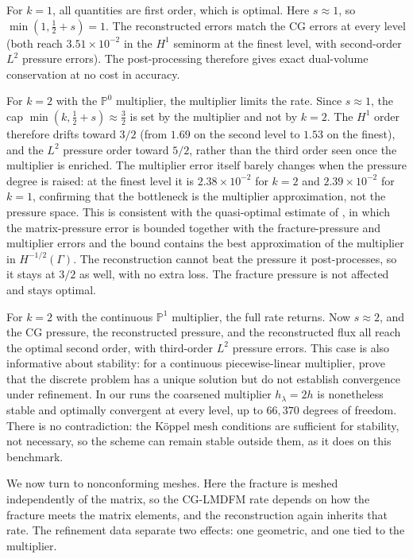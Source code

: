 \documentclass[a4paper,fleqn]{cas-sc}
\begin{document}
For \(k=1\), all quantities are first order, which is optimal. Here \(s\approx1\),
so \(\min(1,\tfrac12+s)=1\). The reconstructed errors match the CG errors at every
level (both reach \(3.51\times10^{-2}\) in the \(H^1\) seminorm at the finest
level, with second-order \(L^2\) pressure errors). The post-processing therefore
gives exact dual-volume conservation at no cost in accuracy.

For \(k=2\) with the \(\mathbb{P}^0\) multiplier, the multiplier limits the rate.
Since \(s\approx1\), the cap \(\min(k,\tfrac12+s)\approx\tfrac32\) is set by the
multiplier and not by \(k=2\). The \(H^1\) order therefore drifts toward \(3/2\)
(from \(1.69\) on the second level to \(1.53\) on the finest), and the \(L^2\)
pressure order toward \(5/2\), rather than the third order seen once the
multiplier is enriched. The multiplier error itself barely changes when the
pressure degree is raised: at the finest level it is \(2.38\times10^{-2}\) for
\(k=2\) and \(2.39\times10^{-2}\) for \(k=1\), confirming that the bottleneck is
the multiplier approximation, not the pressure space. This is consistent with the
quasi-optimal estimate of \citet[Theorems~2 and~3]{Koeppel2019}, in which the
matrix-pressure error is bounded together with the fracture-pressure and
multiplier errors and the bound contains the best approximation of the multiplier
in \(H^{-1/2}(\Gamma)\). The reconstruction cannot beat the pressure it
post-processes, so it stays at \(3/2\) as well, with no extra loss. The fracture
pressure is not affected and stays optimal.

For \(k=2\) with the continuous \(\mathbb{P}^1\) multiplier, the full rate
returns. Now \(s\approx2\), and the CG pressure, the reconstructed pressure, and
the reconstructed flux all reach the optimal second order, with third-order
\(L^2\) pressure errors. This case is also informative about stability: for a
continuous piecewise-linear multiplier, \citet[Section~3.3]{Koeppel2019} prove
that the discrete problem has a unique solution but do not establish convergence
under refinement. In our runs the coarsened multiplier \(h_\lambda=2h\) is
nonetheless stable and optimally convergent at every level, up to \(66{,}370\)
degrees of freedom. There is no contradiction: the K\"oppel mesh conditions are
sufficient for stability, not necessary, so the scheme can remain stable outside
them, as it does on this benchmark.

We now turn to nonconforming meshes. Here the fracture is meshed independently of
the matrix, so the CG-LMDFM rate depends on how the fracture meets the matrix
elements, and the reconstruction again inherits that rate. The refinement data
separate two effects: one geometric, and one tied to the multiplier.
\end{document}

